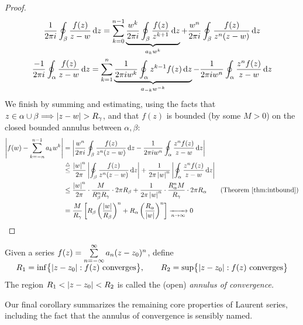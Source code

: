 \begin{proof}
	\begin{gather*}
		\frac 1{2\pi i}\oint_\beta\frac{f(z)}{z-w}\,{\mathrm{d} z}
		=\sum_{k=0}^{n-1}\underbrace{\frac{w^k}{2\pi i}\oint_\beta \frac{f(z)}{z^{k+1}}\,{\mathrm{d} z}}_{a_kw^k} +\frac{w^n}{2\pi i}\oint_\beta \frac{f(z)}{z^n(z-w)}\,{\mathrm{d} z}\\
		\frac{-1}{2\pi i}\oint_\alpha\frac{f(z)}{z-w}\,{\mathrm{d} z} =\sum_{k=1}^{n}\underbrace{\frac 1{2\pi iw^k}\oint_\alpha z^{k-1}f(z)\,{\mathrm{d} z}}_{a_{-k}w^{-k}} -\frac 1{2\pi i w^n}\oint_\alpha \frac{z^nf(z)}{z-w}\,{\mathrm{d} z}
	\end{gather*}
	We finish by summing and estimating, using the facts that $z\in\alpha\cup\beta\Longrightarrow\nm{z-w}>R_\gamma$, and that $f(z)$ is bounded (by some $M>0$) on the closed bounded annulus between $\alpha,\beta$:
	\begin{align*}
		\nm{f(w)-\sum_{k=-n}^{n-1}a_kw^k}
		&=\nm{\frac{w^n}{2\pi i}\oint_\beta \frac{f(z)}{z^n(z-w)}\,\dz -\frac 1{2\pi iw^n}\oint_\alpha \frac{z^nf(z)}{z-w}\,\dz}\\
		&\overset{\triangle}{\le} \frac{\nm w^n}{2\pi}\nm{\oint_\beta \frac{f(z)}{z^n(z-w)}\,\dz} +\frac 1{2\pi\nm w^n}\nm{\oint_\alpha \frac{z^nf(z)}{z-w}\,\dz}\\
		&\le \frac{\nm w^n}{2\pi}\cdot\frac{M}{R_\beta^nR_\gamma}\cdot 2\pi R_\beta +\frac 1{2\pi\nm w^n}\cdot \frac{R_\alpha^nM}{R_\gamma}\cdot 2\pi R_\alpha
			\tag{Theorem \ref{thm:intbound}}\\
		&=\frac M{R_\gamma}\left[R_\beta\left(\frac{\nm w}{R_\beta}\right)^n+R_\alpha\left(\frac{R_\alpha}{\nm w}\right)^n\right] \xrightarrow[n\to\infty]{} 0
		\tag*{\qedhere}
	\end{align*}
\end{proof}

\goodbreak

\begin{defn}{}{}
	Given a series $\smash[b]{f(z)=\sum\limits_{n=-\infty}^\infty a_n(z-z_0)^n}$, define
	\[
		R_1=\inf\bigl\{\left| z-z_0\right|:f(z)\text{ converges}\bigr\},\qquad 
		R_2=\sup\bigl\{\left| z-z_0\right|:f(z)\text{ converges}\bigr\}
	\]
	The region $R_1<\left| z-z_0\right|<R_2$ is called the (open) \emph{annulus of convergence.}
\end{defn}

Our final corollary summarizes the remaining core properties of Laurent series, including the fact that the annulus of convergence is sensibly named. 


